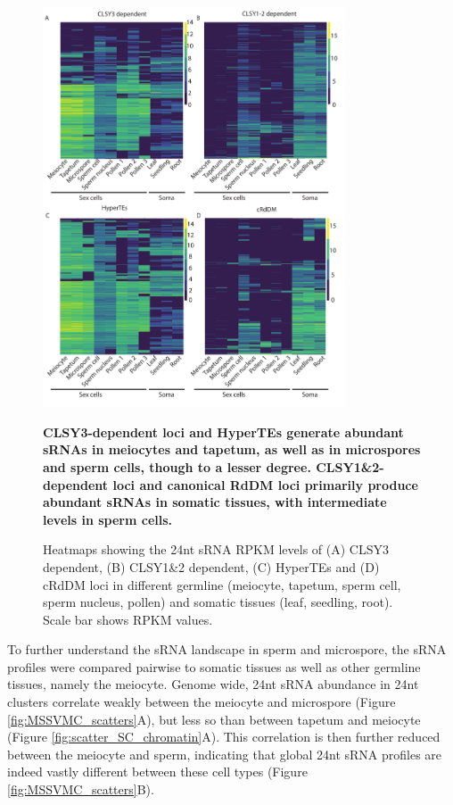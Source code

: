 \begin{figure}[htbp!] 
\centering    
    \includegraphics[width=0.8\textwidth]{Chapter2/Figs/Figure8_Heatmaps_CLSY3_CLSY1_2vs_cRdDMs_HyperTEs.pdf}
\caption{\textbf{CLSY3-dependent loci and HyperTEs generate abundant sRNAs in meiocytes and tapetum, as well as in microspores and sperm cells, though to a lesser degree. CLSY1\&2-dependent loci and canonical RdDM loci primarily produce abundant sRNAs in somatic tissues, with intermediate levels in sperm cells.}}
\label{fig:hm_CLSY3_CLSY1}
\captionsetup{font=small}
    \caption*{Heatmaps showing the 24nt sRNA RPKM levels of (A) CLSY3 dependent, (B) CLSY1\&2 dependent, (C) HyperTEs and (D) cRdDM loci in different germline (meiocyte, tapetum, sperm cell, sperm nucleus, pollen) and somatic tissues (leaf, seedling, root). Scale bar shows RPKM values.}
\end{figure}

To further understand the sRNA landscape in sperm and microspore, the sRNA profiles were compared pairwise to somatic tissues as well as other germline tissues, namely the meiocyte. Genome wide, 24nt sRNA abundance in 24nt clusters correlate weakly between the meiocyte and microspore (Figure \ref{fig:MSSVMC_scatters}A), but less so than between tapetum and meiocyte (Figure \ref{fig:scatter_SC_chromatin}A). This correlation is then further reduced between the meiocyte and sperm, indicating that global 24nt sRNA profiles are indeed vastly different between these cell types (Figure \ref{fig:MSSVMC_scatters}B).

